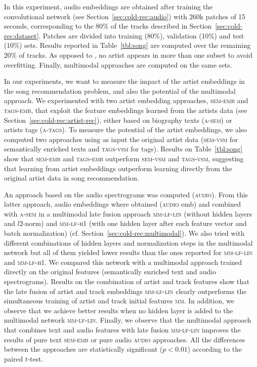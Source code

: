 In this experiment, audio embeddings are obtained after training the convolutional network (see Section~\ref{sec:cold-rec:audio}) with 260k patches of 15 seconds, corresponding to the 80\% of the tracks described in Section~\ref{sec:cold-rec:dataset}. Patches are divided into training (80\%), validation (10\%) and test (10\%) sets. Results reported in Table~\ref{tbl:song} are computed over the remaining 20\% of tracks. %
As opposed to \cite{Oord2013}, no artist appears in more than one subset to avoid overfitting. Finally, multimodal approaches are computed on the same sets.

In our experiments, we want to measure the impact of the artist embeddings in the song recommendation problem, and also the potential of the multimodal approach. We experimented with two artist embedding approaches, \textsc{sem-emb} and \textsc{tags-emb}, that exploit the feature embeddings learned from the artists data (see Section~\ref{sec:cold-rec:artist-rec}), either based on biography texts (\textsc{a-sem}) or artists tags (\textsc{a-tags}). To measure the potential of the artist embeddings, we also computed two approaches using as input the original artist data (\textsc{sem-vsm} for semantically enriched texts and \textsc{tags-vsm} for tags). Results on Table~\ref{tbl:song} show that \textsc{sem-emb} and \textsc{tags-emb} outperform \textsc{sem-vsm} and \textsc{tags-vsm}, suggesting that learning from artist embeddings outperform learning directly from the original artist data in song recommendation.

An approach based on the audio spectrograms was computed (\textsc{audio}). From this latter approach, audio embeddings where obtained (\textsc{audio} emb) and combined with \textsc{a-sem} in a multimodal late fusion approach \textsc{mm-lf-lin} (without hidden layers and $l2$-norm) and \textsc{mm-lf-h1} (with one hidden layer after each feature vector and batch normalization) (cf. Section~\ref{sec:cold-rec:multimodal}). We also tried with different combinations of hidden layers and normalization steps in the multimodal network but all of them yielded lower results than the ones reported for \textsc{mm-lf-lin} and \textsc{mm-lf-h1}. We compared this network with a multimodal approach trained directly on the original features (semantically enriched text and audio spectrograms). Results on the combination of artist and track features show that the late fusion of artist and track embeddings \textsc{mm-lf-lin} clearly outperforms the simultaneous training of artist and track initial features \textsc{mm}. In addition, we observe that we achieve better results when no hidden layer is added to the multimodal network \textsc{mm-lf-lin}. Finally, we observe that the multimodal approach that combines text and audio features with late fusion \textsc{mm-lf-lin} improves the results of pure text \textsc{sem-emb} or pure audio \textsc{audio} approaches. All the differences between the approaches are statistically significant ($p < 0.01$) according to the paired $t$-test.

